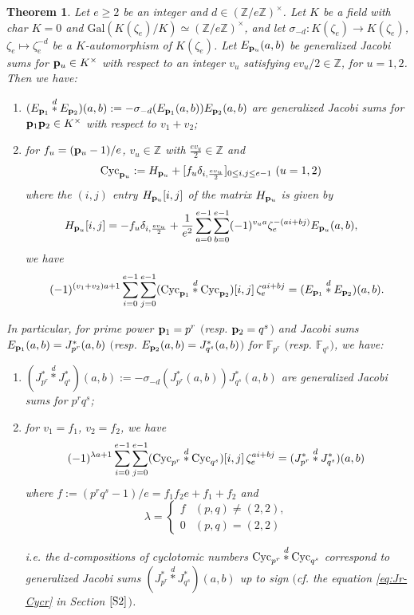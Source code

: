 \documentclass[a4paper, 11pt]{amsart}
\newcommand{\Z}{\mathbb Z}
\newcommand{\F}{\mathbb F}
\newcommand{\Gal}{\mathrm{Gal}}
\theoremstyle{plain}
\newtheorem{thm}{Theorem}[section]
\theoremstyle{definition}
\numberwithin{equation}{section}
\begin{document}
\begin{thm}\label{mainth1}
Let $e \geq 2$ be an integer and $d \in (\Z/e\Z)^{\times}$. 
Let $K$ be a field with 
char $K=0$ and $\Gal(K(\zeta_e)/K)\simeq (\Z/e\Z)^{\times}$, 
and 
let $\sigma_{-d}: K(\zeta_e) \to K(\zeta_e)$, $\zeta_e \mapsto \zeta_e^{-d}$ 
be a $K$-automorphism of $K(\zeta_e)$. 
Let 
$E_{{\bf p}_u}(a,b)$ be generalized Jacobi sums 
for ${\bf p}_u \in K^\times$ with respect to
an integer $v_u$ satisfying $ev_u/2 \in \Z$, for $u=1,2$.  
Then we have:
\begin{enumerate}
\item $(E_{{\bf p}_1}\overset{d}{\ast}E_{{\bf p}_2})(a,b):= -\sigma_{-d}(E_{{\bf p}_1}(a,b))E_{{\bf p}_2}(a,b)$ are generalized Jacobi sums for ${\bf p}_1{\bf p}_2 \in K^\times$ with respect to $v_1+v_2$;
\item for $f_u = ({\bf p}_u -1)/e$, $v_u \in \Z$ with $\frac{ev_u}{2} \in \Z$ and
\begin{align*}
{\rm Cyc}_{{\bf p}_u}&:=H_{{\bf p}_u} + [f_u\delta_{i,\frac{ev_u}{2}}]_{0\leq i,j\leq e-1} \ (u=1,2)
\end{align*}
where the $(i,j)$ entry $H_{{\bf p}_u}[i,j]$ of the matrix $H_{{\bf p}_u}$ 
is given by 
\begin{align*}
H_{{\bf p}_u}[i,j]&=-f_u\delta_{i,\frac{ev_u}{2}}+\frac{1}{e^2}\sum^{e-1}_{a=0} \sum^{e-1}_{b=0} (-1)^{v_ua} \zeta_e^{-(ai+bj)}E_{{\bf p}_u}(a,b),
\end{align*}
we have
\begin{align*}
(-1)^{(v_1+ v_2)a+1}\sum_{i=0}^{e-1}\sum_{j=0}^{e-1}({\rm Cyc}_{{\bf p}_1}\overset{d}{\ast}{\rm Cyc}_{{\bf p}_2})[i,j]\,\zeta_e^{ai+bj}
=(E_{{\bf p}_1}\overset{d}{\ast}E_{{\bf p}_2})(a,b).
\end{align*}
\end{enumerate}

In particular, for prime power ${\bf p}_1=p^r$ $($resp.  ${\bf p}_2=q^s$$)$ 
and Jacobi sums
$E_{{\bf p}_1}(a,b)=J^\ast_{p^r}(a,b)$ 
$($resp. $E_{{\bf p}_2}(a,b)=J^\ast_{q^s}(a,b)$$)$ for $\F_{p^r}$ 
$($resp. $\F_{q^s}$$)$, we have:
\begin{enumerate}
\item $(J^{*}_{p^r}\overset{d}{\ast}J^{*}_{q^s})(a,b):= -\sigma_{-d}(J^\ast_{p^r}(a,b))J^\ast_{q^s}(a,b)$ are generalized Jacobi sums for $p^rq^s$;
\item for $v_1=f_1$, $v_2=f_2$, we have
\[
(-1)^{\lambda a +1} \sum_{i=0}^{e-1}\sum_{j=0}^{e-1}({\rm Cyc}_{p^r}\overset{d}{\ast}{\rm Cyc}_{q^s})[i,j]\,\zeta_e^{ai+bj}
= (J^{*}_{p^r}\overset{d}{\ast}J^{*}_{q^s})(a,b)
\]
where $f:=(p^rq^s-1)/e =f_1f_2e+f_1+f_2$ and
\[
\lambda = 
\begin{cases}
f & (p,q)\neq(2,2),\\ 
0 & (p,q)=(2,2)
\end{cases}
\]

i.e. the $d$-compositions of cyclotomic numbers ${\rm Cyc}_{p^r}\overset{d}{\ast}{\rm Cyc}_{q^s}$ 
correspond to generalized Jacobi sums $(J^{*}_{p^r}\overset{d}{\ast}J^{*}_{q^s})(a,b)$ up to sign 
$($cf. the equation \eqref{eq:Jr-Cycr} in Section $\ref{S2}$$)$.
\end{enumerate}
\end{thm}
\end{document}

